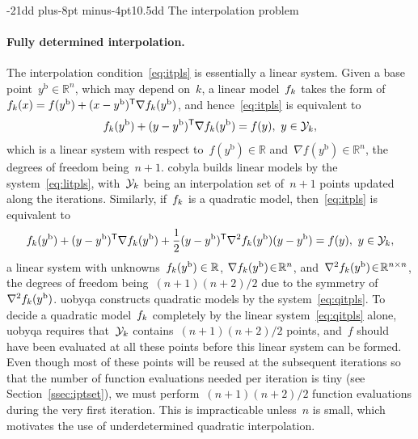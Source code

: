 \documentclass[
    smallextended,  %
    final,          %
]{svjour3}
\makeatletter
\newcommand{\R}{\mathbb{R}}
\newcommand{\T}{\mathsf{T}}
\newcommand{\base}{{\text{b}}}
\newcommand{\objm}[1][k]{\obj\ifthenelse{\equal{#1}{}}{}{_{#1}}}
\newcommand{\obj}{f}
\newcommand{\xpt}[1][k]{\mathcal{Y}\ifthenelse{\equal{#1}{}}{}{_{#1}}}
\def\subsubsection{\@startsection{subsubsection}{2}{\z@}%
    {-21dd plus-8pt minus-4pt}{10.5dd}
     {\normalsize\bfseries}}
\makeatother
\begin{document}
\subsubsection{The interpolation problem}
\label{ssec:iptprob}

\paragraph{\textnormal{\textbf{Fully determined interpolation.}}}

The interpolation condition~\eqref{eq:itpls} is essentially a linear system.
Given a base point~$y^{\base}\in \R^n$, which may depend on~$k$, a linear model~$\objm$ takes the
form of~$\objm(x) = \obj(y^{\base}) + (x - y^{\base})^{\T} \nabla \objm(y^{\base})$, and
hence~\eqref{eq:itpls} is equivalent to
\begin{equation}
    \label{eq:litpls}
    \objm(y^{\base}) + (y -y^{\base})^{\T} \nabla \objm(y^{\base})  = \obj(y),  ~ y \in \xpt,
\end{equation}
which is a linear system with respect to~$\obj(y^\base) \in \R$ and~$\nabla \obj(y^\base) \in \R^n$, the degrees of freedom being~$n+1$.
\Gls{cobyla} builds linear models by the system~\eqref{eq:litpls}, with~$\xpt$ being an interpolation
set of~$n+1$ points updated along the iterations.
Similarly, if~$\objm$ is a quadratic model, then~\eqref{eq:itpls} is equivalent to
\begin{equation}
    \label{eq:qitpls}
    \objm(y^{\base}) + (y -y^{\base})^{\T} \nabla \objm(y^{\base})
    + \frac{1}{2}(y-y^{\base})^{\T}  \nabla^2 \objm(y^{\base}) (y-y^{\base}) = \obj(y),  ~ y \in \xpt,
\end{equation}
a linear system with unknowns~$\objm(y^\base) \in \R$, $\nabla \objm(y^\base) \!\in\! \R^n$,
and~$\nabla^2 \objm(y^{\base})\!\in\!\R^{n \times n}$, the degrees of freedom being~$(n + 1)(n + 2) / 2$ due to the symmetry of~$\nabla^2 \objm(y^\base)$.
\gls{uobyqa} constructs quadratic models by the system~\eqref{eq:qitpls}.
To decide a quadratic model~$\objm$ completely by the linear system~\eqref{eq:qitpls} alone,
\gls{uobyqa} requires that~$\xpt$ contains~$(n+1)(n+2)/2$ points, and~$f$ should have been evaluated at all these points before this linear system can be formed.
Even though most of these points will be reused at the subsequent iterations so that the number of
function evaluations needed per iteration is tiny (see Section~\ref{ssec:iptset}), we must perform~$(n + 1)(n + 2) / 2$ function evaluations during the very first iteration.
This is impracticable unless~$n$ is small, which motivates the use of underdetermined quadratic interpolation.
\end{document}
